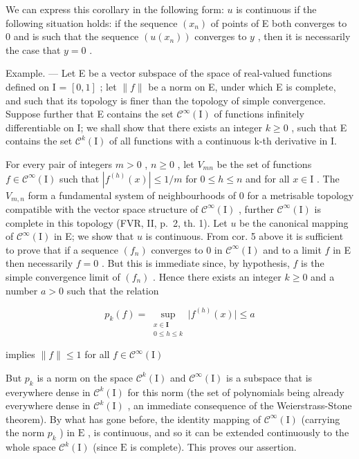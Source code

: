 We can express this corollary in the following form: \(u\) is continuous if the following situation holds: if the sequence \((x_{n})\) of points of E both converges to 0 and is such that the sequence \((u(x_{n}))\) converges to \(y\) , then it is necessarily the case that \(y = 0\) .

Example. --- Let E be a vector subspace of the space of real-valued functions defined on I = \([0, 1]\) ; let \(\|f\|\) be a norm on E, under which E is complete, and such that its topology is finer than the topology of simple convergence. Suppose further that E contains the set \(\mathcal{C}^{\infty}(\mathrm{I})\) of functions infinitely differentiable on I; we shall show that there exists an integer \(k \geqslant 0\) , such that E contains the set \(\mathcal{C}^{k}(\mathrm{I})\) of all functions with a continuous k-th derivative in I.

For every pair of integers \(m > 0\) , \(n \geqslant 0\) , let \(V_{mn}\) be the set of functions \(f \in \mathcal{C}^{\infty}(\mathrm{I})\) such that \(|f^{(h)}(x)| \leqslant 1 / m\) for \(0 \leqslant h \leqslant n\) and for all \(x \in \mathrm{I}\) . The \(V_{m,n}\) form a fundamental system of neighbourhoods of 0 for a metrisable topology compatible with the vector space structure of \(\mathcal{C}^{\infty}(\mathrm{I})\) , further \(\mathcal{C}^{\infty}(\mathrm{I})\) is complete in this topology (FVR, II, p.~2, th. 1). Let \(u\) be the canonical mapping of \(\mathcal{C}^{\infty}(\mathrm{I})\) in E; we show that \(u\) is continuous. From cor. 5 above it is sufficient to prove that if a sequence \((f_n)\) converges to 0 in \(\mathcal{C}^{\infty}(\mathrm{I})\) and to a limit \(f\) in E then necessarily \(f = 0\) . But this is immediate since, by hypothesis, \(f\) is the simple convergence limit of \((f_n)\) . Hence there exists an integer \(k \geqslant 0\) and a number \(a > 0\) such that the relation

\[
p_{k}(f) = \sup_{\substack{x\in \mathbf{I}\\ 0\leqslant h\leqslant k}}\big|f^{(h)}(x)\big|\leqslant a
\]

implies \(\| f\| \leqslant 1\) for all \(f\in \mathcal{C}^{\infty}(\mathrm{I})\)

But \(p_k\) is a norm on the space \(\mathcal{C}^k(\mathrm{I})\) and \(\mathcal{C}^\infty(\mathrm{I})\) is a subspace that is everywhere dense in \(\mathcal{C}^k(\mathrm{I})\) for this norm (the set of polynomials being already everywhere dense in \(\mathcal{C}^k(\mathrm{I})\) , an immediate consequence of the Weierstrass-Stone theorem). By what has gone before, the identity mapping of \(\mathcal{C}^\infty(\mathrm{I})\) (carrying the norm \(p_k\) ) in \(\mathrm{E}\) , is continuous, and so it can be extended continuously to the whole space \(\mathcal{C}^k(\mathrm{I})\) (since \(\mathrm{E}\) is complete). This proves our assertion.

